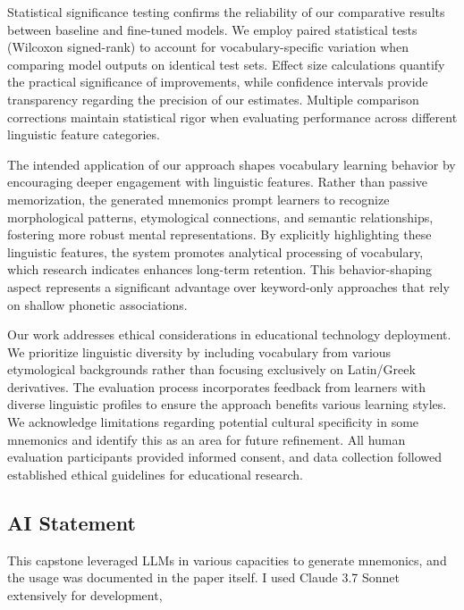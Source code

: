 Statistical significance testing confirms the reliability of our comparative results between baseline and fine-tuned models. We employ paired statistical tests (Wilcoxon signed-rank) to account for vocabulary-specific variation when comparing model outputs on identical test sets. Effect size calculations quantify the practical significance of improvements, while confidence intervals provide transparency regarding the precision of our estimates. Multiple comparison corrections maintain statistical rigor when evaluating performance across different linguistic feature categories.

 The intended application of our approach shapes vocabulary learning behavior by encouraging deeper engagement with linguistic features. Rather than passive memorization, the generated mnemonics prompt learners to recognize morphological patterns, etymological connections, and semantic relationships, fostering more robust mental representations. By explicitly highlighting these linguistic features, the system promotes analytical processing of vocabulary, which research indicates enhances long-term retention. This behavior-shaping aspect represents a significant advantage over keyword-only approaches that rely on shallow phonetic associations.

 Our work addresses ethical considerations in educational technology deployment. We prioritize linguistic diversity by including vocabulary from various etymological backgrounds rather than focusing exclusively on Latin/Greek derivatives. The evaluation process incorporates feedback from learners with diverse linguistic profiles to ensure the approach benefits various learning styles. We acknowledge limitations regarding potential cultural specificity in some mnemonics and identify this as an area for future refinement. All human evaluation participants provided informed consent, and data collection followed established ethical guidelines for educational research.

\subsection{AI Statement} \label{sec:ai-statement}
This capstone leveraged LLMs in various capacities to generate mnemonics, and the usage was documented in the paper itself. I used Claude 3.7 Sonnet extensively for development,
